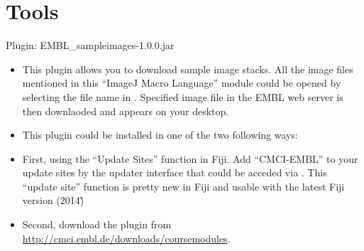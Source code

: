 \section{Tools}
\label{sec:tools}

  \itemImageJ Plugin: EMBL\_sampleimages-1.0.0.jar

\begin{itemize}
     \item This plugin allows you to download sample image stacks. All the image files mentioned in this ``ImageJ Macro Language'' module could be opened by selecting the file name in . Specified image file in the EMBL web server is then downlaoded and appears on your desktop.
    \item This plugin could be installed in one of the two following ways:
    \item First, using the ``Update Sites'' function in Fiji. Add ``CMCI-EMBL'' to your update sites by the updater interface that could be acceded via . This ``update site'' function is pretty new in Fiji and usable with the latest Fiji version (2014\~)        
    \item Second, download the plugin from \url{http://cmci.embl.de/downloads/coursemodules}. 
  \end{itemize}

\newpage